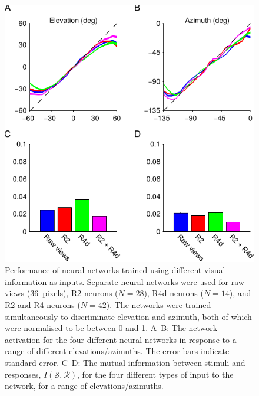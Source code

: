 \begin{figure}
\centering
\includegraphics{figures/elaz}
\caption{Performance of neural networks trained using different visual information as inputs.
Separate neural networks were used for raw views (36~pixels), R2 neurons ($N=28$), R4d neurons ($N=14$), and R2 and R4 neurons ($N=42$).
The networks were trained simultaneously to discriminate elevation and azimuth, both of which were normalised to be between 0 and 1.
A--B: The network activation for the four different neural networks in response to a range of different elevations/azimuths.
The error bars indicate standard error.
C--D: The mutual information between stimuli and responses, $I(\mathcal{S},\mathcal{R})$, for the four different types of input to the network, for a range of elevations/azimuths.
}
\label{fig:elaz}
\end{figure}
